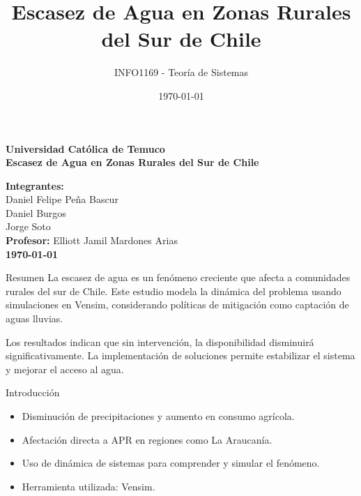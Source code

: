 \documentclass[aspectratio=169]{beamer}
\title{Escasez de Agua en Zonas Rurales del Sur de Chile}
\subtitle{INFO1169 - Teoría de Sistemas}
\institute{Universidad Católica de Temuco}
\date{\today}
\author{} %
\begin{document}
\begin{frame}[plain]
  \vspace*{1.5cm}
  \begin{center}
      \textbf{\large Universidad Católica de Temuco}\\[0.3cm]
    {\Huge \textbf{Escasez de Agua en Zonas Rurales del Sur de Chile}}\\[0.7cm]

  \end{center}
  \vfill
  \begin{flushright}
    \textbf{Integrantes:} \\
    Daniel Felipe Peña Bascur \\
    Daniel Burgos \\
    Jorge Soto \\[0.2cm]
    \textbf{Profesor:} Elliott Jamil Mardones Arias \\[0.2cm]
    \textbf{\today}
  \end{flushright}
\end{frame}

\author{}

\begin{frame}{Resumen}
La escasez de agua es un fenómeno creciente que afecta a comunidades rurales del sur de Chile. Este estudio modela la dinámica del problema usando simulaciones en Vensim, considerando políticas de mitigación como captación de aguas lluvias.

Los resultados indican que sin intervención, la disponibilidad disminuirá significativamente. La implementación de soluciones permite estabilizar el sistema y mejorar el acceso al agua.
\end{frame}

\begin{frame}{Introducción}
\begin{itemize}
    \item Disminución de precipitaciones y aumento en consumo agrícola.
    \item Afectación directa a APR en regiones como La Araucanía.
    \item Uso de dinámica de sistemas para comprender y simular el fenómeno.
    \item Herramienta utilizada: Vensim.
\end{itemize}
\end{frame}
\end{document}
